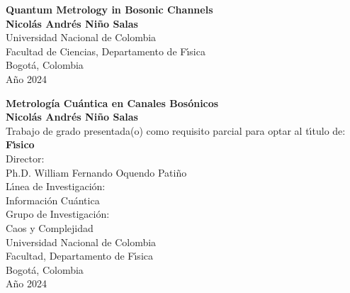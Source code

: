 \begin{center}
\begin{figure}
\centering%
%
\end{figure}
\thispagestyle{empty} \vspace*{2.0cm} \textbf{\huge
Quantum Metrology in Bosonic Channels}\\[6.0cm]
\Large\textbf{Nicol\'{a}s Andr\'{e}s Ni\~{n}o Salas}\\[6.0cm]
\small Universidad Nacional de Colombia\\
Facultad de Ciencias, Departamento de F\'{\i}sica\\
Bogot\'{a}, Colombia\\
A\~{n}o 2024\\
\end{center}

\newpage{\pagestyle{empty}\cleardoublepage}

\newpage
\begin{center}
\thispagestyle{empty} \vspace*{0cm} \textbf{\huge
Metrolog\'{i}a Cu\'{a}ntica en Canales Bos\'{o}nicos}\\[3.0cm]
\Large\textbf{Nicol\'{a}s Andr\'{e}s Ni\~{n}o Salas}\\[3.0cm]
\small Trabajo de grado presentada(o) como requisito parcial para optar al
t\'{\i}tulo de:\\
\textbf{F\'{\i}sico}\\[2.5cm]
Director:\\
Ph.D. William Fernando Oquendo Pati\~{n}o\\[2.0cm]
L\'{\i}nea de Investigaci\'{o}n:\\
Informaci\'{o}n  Cu\'{a}ntica\\
Grupo de Investigaci\'{o}n:\\
Caos y Complejidad\\[2.5cm]
Universidad Nacional de Colombia\\
Facultad, Departamento de F\'{\i}sica\\
Bogot\'{a}, Colombia\\
A\~{n}o 2024\\
\end{center}

\newpage{\pagestyle{empty}\cleardoublepage}

\newpage
\thispagestyle{empty} \textbf{}\normalsize

